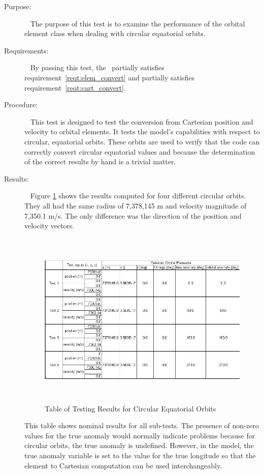 \label{test:circ_equa_per}
\begin{description}
\item[Purpose:] \ \newline
The purpose of this test is to examine the performance of the orbital element
class when dealing with circular equatorial orbits.
\item[Requirements:] \ \newline
By passing this test, the \OrbitalElement\ partially satisfies
requirement~\ref{reqt:elem_convert} and partially satisfies
requirement~\ref{reqt:cart_convert}.
\item[Procedure:]\ \newline
This test is designed to test the conversion from Cartesian position and
velocity to orbital elements.  It tests the model's capabilities with respect
to circular, equatorial orbits.  These orbits are used to verify that the
code can correctly convert circular equatorial values and because the
determination of the correct results by hand is a trivial matter.
\item[Results:]\ \newline
Figure \ref{cir_eq_tab} shows the results computed for four different circular
orbits.  They all had the same radius of 7,378,145 m and velocity magnitude of
7,350.1 m/s.  The only difference was the direction of the position and velocity
vectors.

\begin{figure}[h]
\begin{center}
\includegraphics[height=85mm]{JPGfiles/circ_equa.jpg}
\caption{Table of Testing Results for Circular Equatorial Orbits}
\label{cir_eq_tab}
\end{center}
\end{figure}
This table shows nominal results for all sub-tests.  The presence of non-zero
values for the true anomaly would normally indicate problems because for
circular orbits, the true anomaly is undefined.  However, in the model, the
true anomaly variable is set to the value for the true longitude so that the
element to Cartesian computation can be used interchangeably.


\end{description}
